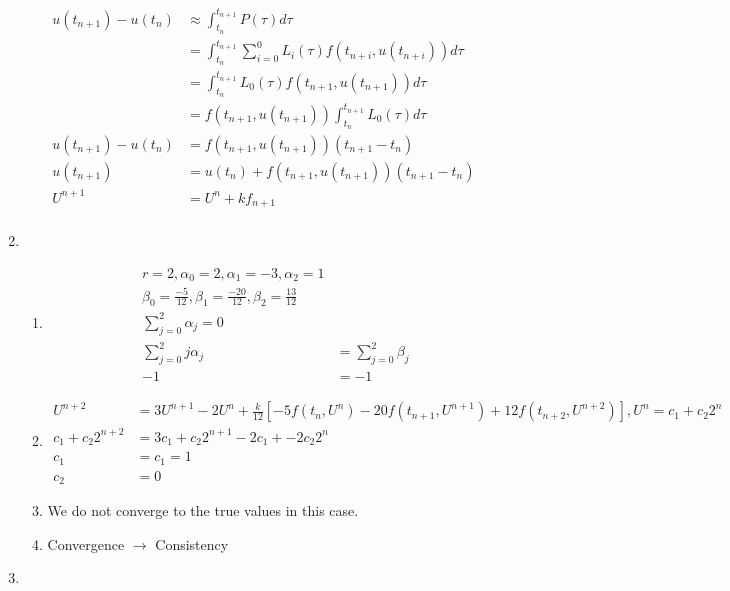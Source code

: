 \documentclass{article}
\begin{document}
\begin{enumerate}
\begin{equation*}
\begin{split}
	u(t_{n+1}) - u(t_{n}) & \approx \int_{t_{n}}^{t_{n+1}} P(\tau) d\tau \\
	& =  \int_{t_{n}}^{t_{n+1}} \sum_{i=0}^{0} L_{i}(\tau)f(t_{n+i},u(t_{n+i})) d\tau \\
	& = \int_{t_{n}}^{t_{n+1}} L_{0}(\tau)f(t_{n+1},u(t_{n+1})) d\tau \\
	& = f(t_{n+1},u(t_{n+1})) \int_{t_{n}}^{t_{n+1}} L_{0}(\tau) d\tau \\
	u(t_{n+1})  - u(t_{n}) & = f(t_{n+1},u(t_{n+1}))(t_{n+1}-t_{n}) \\
	u(t_{n+1})  & =u(t_{n})+ f(t_{n+1},u(t_{n+1}))(t_{n+1}-t_{n}) \\
	U^{n+1} & = U^{n} + k f_{n+1} \\
	\end{split}
	\end{equation*}
\item
	\begin{enumerate}
	\item
		\begin{equation*}
		\begin{split}
		r=2, \alpha_{0} = 2, \alpha_{1} = -3, \alpha_{2} = 1 \\
		\beta_{0} = \frac{-5}{12}, \beta_{1} = \frac{-20}{12}, \beta_{2} = \frac{13}{12} \\
		\sum_{j=0}^{2}\alpha_{j} = 0\\
		\sum_{j=0}^{2} j \alpha_{j} & = \sum_{j=0}^{2} \beta_{j}\\
		-1 & = -1
		\end{split}
		\end{equation*}
	\item
		\begin{equation*}
		\begin{split}
		U^{n+2} &= 3U^{n+1} - 2 U^{n} + \frac{k}{12}[-5f(t_{n}, U^{n}) -20f(t_{n+1}, U^{n+1}) + 12f(t_{n+2}, U^{n+2})], U^{n} = c_{1} + c_{2}2^{n} \\
		c_{1} + c_{2}2^{n+2} & = 3c_{1} + c_{2}2^{n+1} - 2c_{1} + -2c_{2}2^{n}  \\
		c_{1} & = c_{1} = 1  \\
		c_{2} & = 0
		\end{split}
		\end{equation*}
	\item
	We do not converge to the true values in this case. 
	\item
	Convergence $\rightarrow$ Consistency
	\end{enumerate}
\item
	\begin{enumerate}

\end{enumerate}
\end{enumerate}
\end{document}
